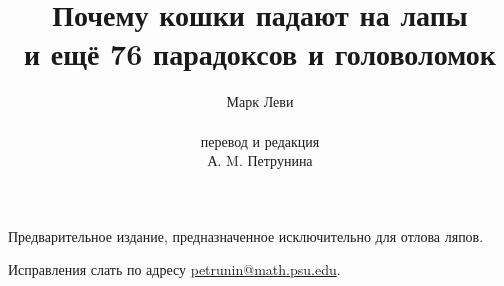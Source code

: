 \documentclass[twoside]{book}
\def\thetitle{Почему кошки падают на лапы}
\begin{document}

\title{\thetitle\\
и ещё 76 парадоксов и головоломок}
\author{Марк Леви
\\
\\
перевод и редакция
\\
А. M. Петрунина}
\date{}
\maketitle

\thispagestyle{empty}

Предварительное издание, предназначенное исключительно для отлова ляпов. 

Исправления слать по адресу 
\url{petrunin@math.psu.edu}.

\vfill

\pagebreak

\thispagestyle{empty}











{

\sloppy

\nocite{*}%
\printbibliography[heading=bibintoc]
\fussy

}


\newpage

{

\tableofcontents

}
\end{document}
